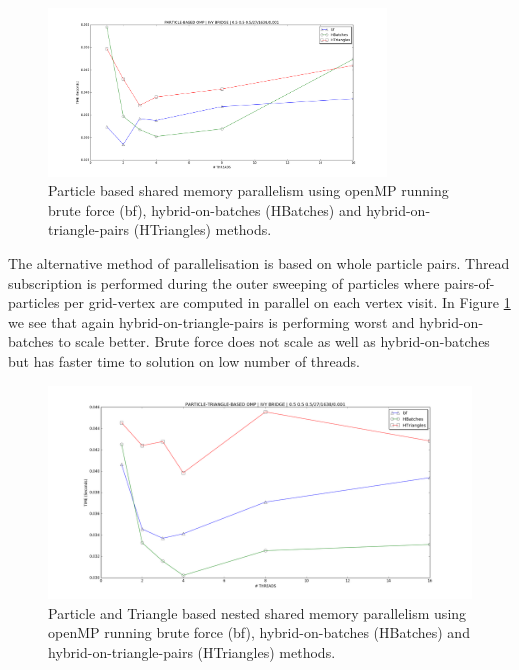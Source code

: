 \begin{figure}[htb]
  \begin{center}
    \includegraphics[width=0.8\textwidth]{experiments/random/omp/particle_based_x0.png}
  \end{center}
  \caption{Particle based shared memory parallelism using openMP running brute force (bf), hybrid-on-batches (HBatches) and hybrid-on-triangle-pairs (HTriangles) methods.}
  \label{figure:particle_omp}
\end{figure}

The alternative method of parallelisation is based on whole particle pairs. Thread subscription is performed during the outer sweeping of particles where pairs-of-particles per grid-vertex are computed in parallel on each vertex visit. In Figure \ref{figure:particle_omp} we see that again hybrid-on-triangle-pairs is performing worst and hybrid-on-batches to scale better. Brute force does not scale as well as hybrid-on-batches but has faster time to solution on low number of threads.

\begin{figure}[htb]
  \begin{center}
    \includegraphics[width=1\textwidth]{experiments/random/omp/particle_triangle_based_x0.png}
  \end{center}
  \caption{Particle and Triangle based nested shared memory parallelism using openMP running brute force (bf), hybrid-on-batches (HBatches) and hybrid-on-triangle-pairs (HTriangles) methods.}
  \label{figure:particletriangle_omp}
\end{figure}

